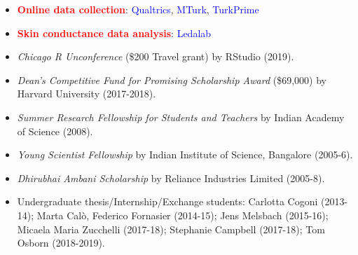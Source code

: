 \documentclass[10pt]{article}
\begin{document}
\begin{itemize}
	
	\item \textcolor{red}{\textbf{Online data collection}}: \textcolor{blue}{Qualtrics}, \textcolor{blue}{MTurk}, \textcolor{blue}{TurkPrime}
	
	
	\item \textcolor{red}{\textbf{Skin conductance data analysis}}: \textcolor{blue}{Ledalab}

    \end{itemize}

	
	\begin{itemize}
	\item \textit{Chicago R Unconference} (\$200 Travel grant) by RStudio (2019).
			
	
	\item \textit{Dean's Competitive Fund for Promising Scholarship Award} (\$69,000) by Harvard University (2017-2018).
		
	
	\item {\it Summer Research Fellowship for Students and Teachers} by Indian Academy of Science (2008).
	
	
	\item {\it Young Scientist Fellowship} by Indian Institute of Science, Bangalore (2005-6).
	
	
	\item {\it Dhirubhai Ambani Scholarship} by Reliance Industries Limited (2005-8). 	
	\end{itemize}
	
	
	\begin{itemize}
	\item Undergraduate thesis/Internship/Exchange students: Carlotta Cogoni (2013-14); Marta Cal\`{o}, Federico Fornasier (2014-15); Jens Melsbach (2015-16); Micaela Maria Zucchelli (2017-18); Stephanie Campbell (2017-18); Tom Osborn (2018-2019).
	\end{itemize}
	
\end{document}
